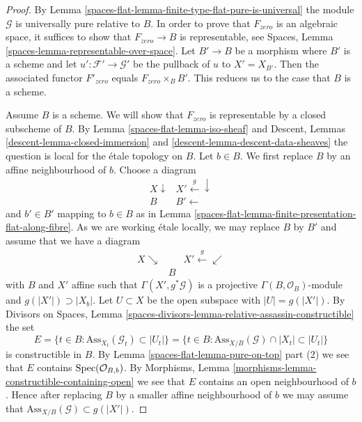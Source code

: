\begin{proof}
By Lemma \ref{spaces-flat-lemma-finite-type-flat-pure-is-universal}
the module $\mathcal{G}$ is universally pure relative to $B$.
In order to prove that $F_{zero}$ is an algebraic space,
it suffices to show that $F_{zero} \to B$ is representable, see
Spaces, Lemma \ref{spaces-lemma-representable-over-space}.
Let $B' \to B$ be a morphism where $B'$ is a scheme and let
$u' : \mathcal{F}' \to \mathcal{G}'$ be the pullback of $u$ to $X' = X_{B'}$.
Then the associated functor $F'_{zero}$ equals $F_{zero} \times_B B'$.
This reduces us to the case that $B$ is a scheme.

\medskip\noindent
Assume $B$ is a scheme. We will show that $F_{zero}$ is representable
by a closed subscheme of $B$. By Lemma \ref{spaces-flat-lemma-iso-sheaf} and
Descent, Lemmas \ref{descent-lemma-closed-immersion} and
\ref{descent-lemma-descent-data-sheaves}
the question is local for the \'etale topology on $B$. Let $b \in B$.
We first replace $B$ by an affine neighbourhood of $b$.
Choose a diagram
$$
\begin{array}{cc}X \downarrow & X' \overset{g}{\longleftarrow}\downarrow \\ B & B' \longleftarrow\end{array}
$$
and $b' \in B'$ mapping to $b \in B$
as in Lemma \ref{spaces-flat-lemma-finite-presentation-flat-along-fibre}.
As we are working \'etale locally, we may replace
$B$ by $B'$ and assume that we have a diagram
$$
\begin{array}{ccc}X \searrow &  & X' \overset{g}{\longleftarrow}\swarrow \\  & B & \end{array}
$$
with $B$ and $X'$ affine such that $\Gamma(X', g^*\mathcal{G})$
is a projective $\Gamma(B, \mathcal{O}_B)$-module and
$g(|X'|) \supset |X_b|$. Let $U \subset X$ be the open subspace
with $|U| = g(|X'|)$. By
Divisors on Spaces, Lemma
\ref{spaces-divisors-lemma-relative-assassin-constructible} the set
$$
E = \{t \in B : \text{Ass}_{X_t}(\mathcal{G}_t) \subset |U_t|\} =
\{t \in B : \text{Ass}_{X/B}(\mathcal{G}) \cap |X_t| \subset |U_t|\}
$$
is constructible in $B$. By Lemma \ref{spaces-flat-lemma-pure-on-top} part (2)
we see that $E$ contains $\operatorname{Spec}(\mathcal{O}_{B, b})$. By
Morphisms, Lemma \ref{morphisms-lemma-constructible-containing-open}
we see that $E$ contains an open neighbourhood of $b$. Hence after
replacing $B$ by a smaller affine neighbourhood of $b$ we may assume that
$\text{Ass}_{X/B}(\mathcal{G}) \subset g(|X'|)$.


\end{proof}
